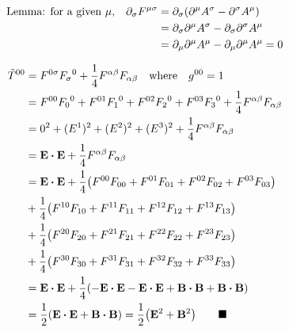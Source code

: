 \documentclass{article}
\begin{document}
\begin{align*}
  \qq*{Lemma: for a given $\mu$,}\partial_\sigma F^{\mu\sigma} & = \partial_\sigma \pqty{\partial^\mu A^\sigma-\partial^\sigma A^\mu}        \\
                                                               & = \partial_\sigma\partial^\mu A^\sigma-\partial_\sigma\partial^\sigma A^\mu \\
                                                               & = \partial_\mu\partial^\mu A^\mu-\partial_\mu\partial^\mu A^\mu=0
\end{align*}

\begin{align*}
  \tilde{T}^{00} & =F^{0\sigma}{F_\sigma}^0+\frac{1}{4}F^{\alpha\beta}F_{\alpha\beta}\qq{where}g^{00}=1                          \\
                 & =F^{00}{F_0}^0+F^{01}{F_1}^0+F^{02}{F_2}^0+F^{03}{F_3}^0+\frac{1}{4}F^{\alpha\beta}F_{\alpha\beta}            \\
                 & =0^2+(E^1)^2+(E^2)^2+(E^3)^2+\frac{1}{4}F^{\alpha\beta}F_{\alpha\beta}                                        \\
                 & =\vb{E}\vdot\vb{E}+\frac{1}{4}F^{\alpha\beta}F_{\alpha\beta}                                                  \\
                 & =\vb{E}\vdot\vb{E}+\frac{1}{4}\pqty{F^{00}F_{00}+F^{01}F_{01}+F^{02}F_{02}+F^{03}F_{03}}                      \\
                 & +\frac{1}{4}\pqty{F^{10}F_{10}+F^{11}F_{11}+F^{12}F_{12}+F^{13}F_{13}}                                        \\
                 & +\frac{1}{4}\pqty{F^{20}F_{20}+F^{21}F_{21}+F^{22}F_{22}+F^{23}F_{23}}                                        \\
                 & +\frac{1}{4}\pqty{F^{30}F_{30}+F^{31}F_{31}+F^{32}F_{32}+F^{33}F_{33}}                                        \\
                 & =\vb{E}\vdot\vb{E}+\frac{1}{4}\pqty{-\vb{E}\vdot\vb{E}-\vb{E}\vdot\vb{E}+\vb{B}\vdot\vb{B}+\vb{B}\vdot\vb{B}} \\
                 & =\frac{1}{2}\pqty{\vb{E}\vdot\vb{E}+\vb{B}\vdot\vb{B}}=\frac{1}{2}\pqty{\vb{E}^2+\vb{B}^2}\qquad\blacksquare  \\
\end{align*}
\end{document}
